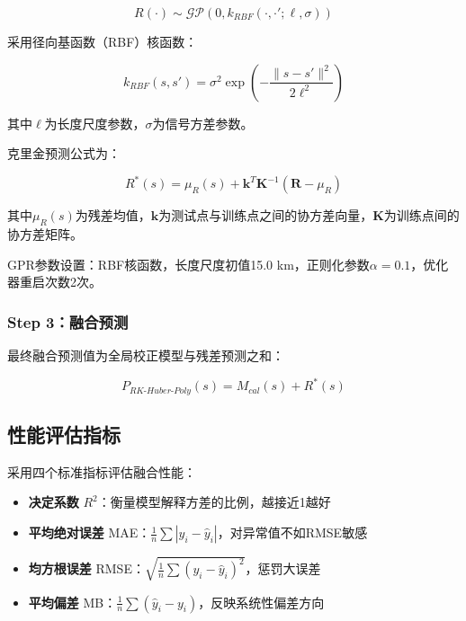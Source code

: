\documentclass[UTF8, a4paper, 12pt]{article}
\begin{document}
\begin{equation}
R(\cdot) \sim \mathcal{GP}(0, k_{RBF}(\cdot, \cdot'; \ell, \sigma))
\end{equation}

采用径向基函数（RBF）核函数：

\begin{equation}
k_{RBF}(s, s') = \sigma^2 \exp\left(-\frac{\|s - s'\|^2}{2\ell^2}\right)
\end{equation}

其中$\ell$为长度尺度参数，$\sigma$为信号方差参数。

克里金预测公式为：

\begin{equation}
R^*(s) = \mu_R(s) + \mathbf{k}^T \mathbf{K}^{-1} (\mathbf{R} - \mu_R)
\end{equation}

其中$\mu_R(s)$为残差均值，$\mathbf{k}$为测试点与训练点之间的协方差向量，$\mathbf{K}$为训练点间的协方差矩阵。

GPR参数设置：RBF核函数，长度尺度初值15.0 km，正则化参数$\alpha=0.1$，优化器重启次数2次。

\subsubsection{Step 3：融合预测}

最终融合预测值为全局校正模型与残差预测之和：

\begin{equation}
P_{RK\text{-}Huber\text{-}Poly}(s) = M_{cal}(s) + R^*(s)
\end{equation}

\subsection{性能评估指标}

采用四个标准指标评估融合性能：

\begin{itemize}
    \item \textbf{决定系数} $R^2$：衡量模型解释方差的比例，越接近1越好
    \item \textbf{平均绝对误差} MAE：$\frac{1}{n}\sum|y_i - \hat{y}_i|$，对异常值不如RMSE敏感
    \item \textbf{均方根误差} RMSE：$\sqrt{\frac{1}{n}\sum(y_i - \hat{y}_i)^2}$，惩罚大误差
    \item \textbf{平均偏差} MB：$\frac{1}{n}\sum(\hat{y}_i - y_i)$，反映系统性偏差方向
\end{itemize}
\end{document}
